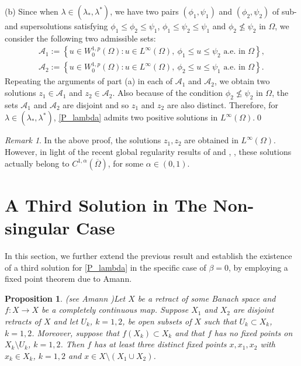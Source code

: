 \documentclass[reqno,oneside]{amsart}
\newtheorem{proposition}[theorem]{Proposition}
\theoremstyle{definition}
\theoremstyle{remark}
\newtheorem{remark}[theorem]{Remark}
\numberwithin{equation}{section}
\newcommand{\la} {\lambda}
\newcommand{\ba}{\beta}
\newcommand{\Om} {\Omega}
\newcommand{\rar}{\rightarrow}
\newcommand{\wop}{W^{1,p}_0 (\Omega)}
\newcommand{\omc}{(\overline{\Om})}
\begin{document}
(b) Since when $\la\in (\la_* , \la^*)$, we have two pairs $(\phi_1, \psi_1)$ and $(\phi_2, \psi_2)$ of sub- and supersolutions satisfying $\phi_1\leq \phi_2 \leq \psi_1$, $\phi_1\leq \psi_2 \leq \psi_1$ and $\phi_2 \not\leq\psi_2$ in $\Om$, we consider the following two admissible sets:
\begin{equation*}
    \begin{aligned}
        \mathcal{A}_1 := \left\{ u\in \wop : u \in L^{\infty} (\Om),\ \phi_1\leq u \leq \psi_2 \text{ a.e. in } \Om \right\},\\
        \mathcal{A}_2 := \left\{ u\in \wop : u \in L^{\infty} (\Om),\ \phi_2\leq u \leq \psi_1 \text{ a.e. in } \Om \right\}.
    \end{aligned}
\end{equation*}
Repeating the arguments of part (a) in each of $\mathcal{A}_1$ and $\mathcal{A}_2$, we obtain two solutions $z_1 \in \mathcal{A}_1$ and $z_2\in \mathcal{A}_2$. Also because of the condition $\phi_2 \not\leq\psi_2$ in $\Om$, the sets $\mathcal{A}_1$ and $\mathcal{A}_2$ are disjoint and so $z_1$ and $z_2$ are also distinct. Therefore, for $\la\in (\la_* , \la^*)$, \eqref{P_lambda} admits two positive solutions in $L^{\infty} (\Om)$.\hfill\qed

\begin{remark}\label{regularity}
    In the above proof, the solutions $z_1, z_2$ are obtained in $L^{\infty} (\Om)$. However, in light of the recent global regularity results of \cite{antonini2025global} and \cite{dhanya2024interiorboundaryregularitymixed}, \cite{bal2025regularityresultsclassmixed}, these solutions actually belong to $C^{1,\alpha} \omc$, for some $\alpha\in (0,1)$.
\end{remark}


\section{A Third Solution in The Non-singular Case}\label{section-third solution}

In this section, we further extend the previous result and establish the existence of a third solution for \eqref{P_lambda} in the specific case of $\ba =0$, by employing a fixed point theorem due to Amann.
\begin{proposition}{(see Amann \cite{amann1976fixed})}\label{amann}
    Let $X$ be a retract of some Banach space and $f: X \rar X$ be a completely continuous map. Suppose $X_1$ and $X_2$ are disjoint retracts of $X$ and let $U_k$, $k=1,2$, be open subsets of $X$ such that $U_k \subset X_k$, $k=1,2$. Moreover, suppose that $f(X_k)\subset X_k$ and that $f$ has no fixed points on $X_k \setminus U_k$, $k=1,2$. Then $f$ has at least three distinct fixed points $x, x_1, x_2$ with $x_k \in X_k$, $k=1,2$ and $x\in X \setminus (X_1 \cup X_2)$.
\end{proposition}
\end{document}
